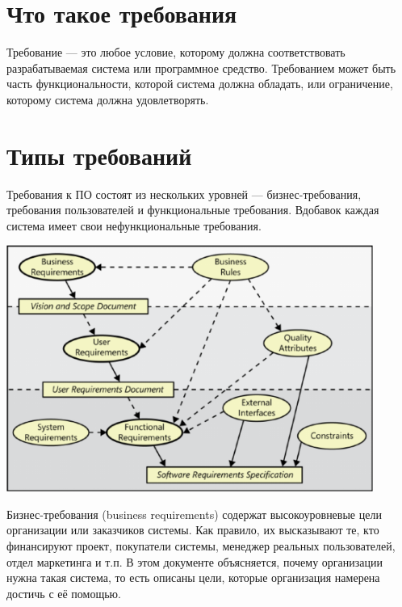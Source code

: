 \documentclass{../../text-style}
\begin{document}
\maketitle
\thispagestyle{empty}


\section{Что такое требования}

Требование --- это любое условие, которому должна соответствовать разрабатываемая система или программное средство. Требованием может быть часть функциональности, которой система должна обладать, или ограничение, которому система должна удовлетворять.

\section{Типы требований}

Требования к ПО состоят из нескольких уровней --- бизнес-требования, требования пользователей и функциональные требования. Вдобавок каждая система имеет свои нефункциональные требования.

\begin{center}
    \includegraphics[width=0.9\textwidth]{requirements.png}
\end{center}


Бизнес-требования (business requirements) содержат высокоуровневые цели организации или заказчиков системы. Как правило, их высказывают те, кто финансируют проект, покупатели системы, менеджер реальных пользователей, отдел маркетинга и т.п. В этом документе объясняется, почему организации нужна такая система, то есть описаны цели, которые организация намерена достичь с её помощью.
\end{document}
